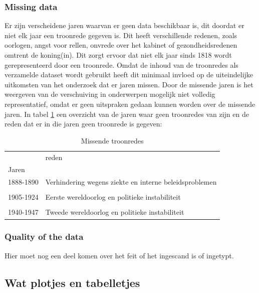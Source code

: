 \subsubsection{Missing data}
Er zijn verscheidene jaren waarvan er geen data beschikbaar is, dit doordat er niet elk jaar een troonrede gegeven is. Dit heeft verschillende redenen, zoals oorlogen, angst voor rellen, onvrede over het kabinet of gezondheidsredenen omtrent de koning(in). Dit zorgt ervoor dat niet elk jaar sinds 1818 wordt gerepresenteerd door een troonrede. Omdat de inhoud van de troonredes als verzamelde dataset wordt gebruikt heeft dit minimaal invloed op de uiteindelijke uitkomsten van het onderzoek dat er jaren missen. Door de missende jaren is het weergeven van de verschuiving in onderwerpen mogelijk niet volledig representatief, omdat er geen uitspraken gedaan kunnen worden over de missende jaren.
In tabel \ref{missing} een overzicht van de jaren waar geen troonredes van zijn en de reden dat er in die jaren geen troonrede is gegeven:
\newline
\newline
\begin{table}[htb]
\centering
\begin{tabular}{ll}
\toprule
{} &                       reden \\
Jaren     &                             \\
\midrule
1888-1890 &  Verhindering wegens ziekte en interne beleidsproblemen\\
\\
1905-1924 &         Eerste wereldoorlog en politieke instabiliteit\\
\\
1940-1947 &         Tweede wereldoorlog en politieke instabiliteit\\
\bottomrule
\end{tabular}
\caption{Missende troonredes}
\label{missing}
\end{table}

\subsubsection{Quality of the data}
Hier moet nog een deel komen over het feit of het ingescand is of ingetypt.

\subsection{Wat plotjes en tabelletjes}

